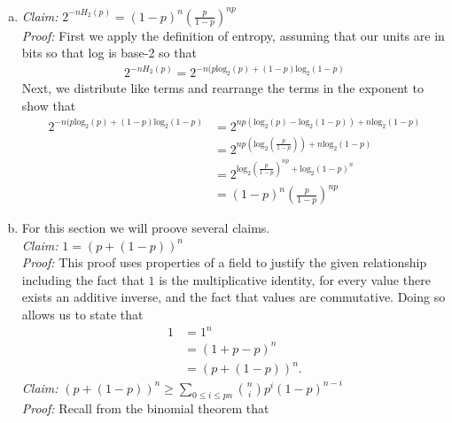 \documentclass{article}
\begin{document}
\begin{enumerate}[(a)]
	\item {\it Claim: } $2^{-nH_2(p)} = (1 - p)^n\left( \frac{p}{1 - p}\right )^{np}$ \\[0.2in]
				{\it Proof: } First we apply the definition of entropy, assuming that our units are in bits so that log is base-2 so that
\begin{equation*}\begin{aligned}
	2^{-nH_2(p)} = 2^{-n(p\text{log}_2(p) + (1 - p)\text{log}_2(1 - p)}
\end{aligned}\end{equation*}
Next, we distribute like terms and rearrange the terms in the exponent to show that
\begin{equation*}\begin{aligned}
	2^{-n(p\text{log}_2(p) + (1 - p)\text{log}_2(1 - p)} &= 2^{np(\text{log}_2(p) - \text{log}_2(1 - p)) + n\text{log}_2(1 - p)} \\
																											 &= 2^{np(\text{log}_2(\frac{p}{1 - p})) + n\text{log}_2(1 - p)} \\
                                                       &= 2^{\text{log}_2(\frac{p}{1 - p})^{np} + \text{log}_2(1 - p)^n} \\
																											 &= (1 - p)^n\left ( \frac{p}{1 - p}\right )^{np}
\end{aligned}\end{equation*}
	\item For this section we will proove several claims. \\[0.2in]
				{\it Claim: } $1 = (p + (1 - p))^n$ \\[0.2in]
				{\it Proof: } This proof uses properties of a field to justify the given relationship including the fact that $1$ is the multiplicative identity, for every value there exists an additive inverse, and the fact that values are commutative. Doing so allows us to state that
\begin{equation*}\begin{aligned}
												1 &= 1^n \\
													&= (1 + p - p)^n \\
													&= (p + (1 - p))^n.
\end{aligned}\end{equation*}
				{\it Claim: } $(p + (1 - p))^n \ge \sum_{0 \le i \le pn}{n \choose i} p^i(1 - p)^{n - i}$ \\[0.2in]
				{\it Proof: } Recall from the binomial theorem that 

\end{enumerate}
\end{document}
